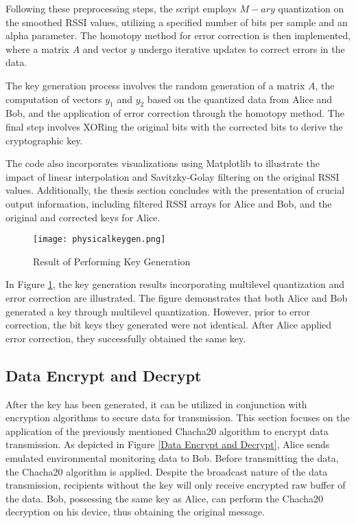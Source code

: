 Following these preprocessing steps, the script employs $M-ary$ quantization on the smoothed RSSI values, utilizing a specified number of bits per sample and an alpha parameter. The homotopy method for error correction is then implemented, where a matrix \(A\) and vector \(y\) undergo iterative updates to correct errors in the data.

The key generation process involves the random generation of a matrix \(A\), the computation of vectors \(y_1\) and \(y_2\) based on the quantized data from Alice and Bob, and the application of error correction through the homotopy method. The final step involves XORing the original bits with the corrected bits to derive the cryptographic key.

The code also incorporates visualizations using Matplotlib to illustrate the impact of linear interpolation and Savitzky-Golay filtering on the original RSSI values. Additionally, the thesis section concludes with the presentation of crucial output information, including filtered RSSI arrays for Alice and Bob, and the original and corrected keys for Alice.
\begin{figure}
  \centering
  \texttt{[image: physicalkeygen.png]}
  \caption{Result of Performing Key Generation}
  \label{physicalkeygen}
\end{figure}

In Figure \ref{physicalkeygen}, the key generation results incorporating multilevel quantization and error correction are illustrated. The figure demonstrates that both Alice and Bob generated a key through multilevel quantization. However, prior to error correction, the bit keys they generated were not identical. After Alice applied error correction, they successfully obtained the same key.

\subsection{Data Encrypt and Decrypt}
After the key has been generated, it can be utilized in conjunction with encryption algorithms to secure data for transmission. This section focuses on the application of the previously mentioned Chacha20 algorithm to encrypt data transmission. As depicted in Figure \ref{Data Encrypt and Decrypt}, Alice sends emulated environmental monitoring data to Bob. Before transmitting the data, the Chacha20 algorithm is applied. Despite the broadcast nature of the data transmission, recipients without the key will only receive encrypted raw buffer of the data. Bob, possessing the same key as Alice, can perform the Chacha20 decryption on his device, thus obtaining the original message.

